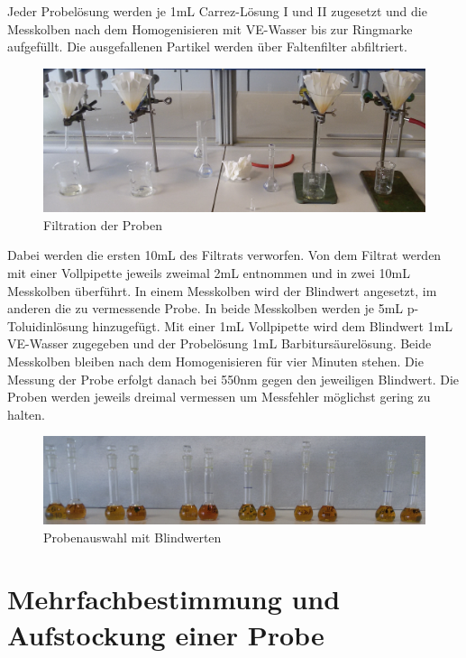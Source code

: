Jeder Probelösung werden je 1mL Carrez-Lösung I und II zugesetzt und die Messkolben nach dem Homogenisieren mit VE-Wasser bis zur Ringmarke aufgefüllt. Die ausgefallenen Partikel werden über Faltenfilter abfiltriert.

\begin{figure}[htbp]
    \centering
        \includegraphics[width=1.00\textwidth]{../Bilder/20150427_131648.jpg}
    \caption{Filtration der Proben}
    \label{fig:Filtration}
\end{figure}

Dabei werden die ersten 10mL des Filtrats verworfen. Von dem Filtrat werden mit einer Vollpipette jeweils zweimal 2mL entnommen und in zwei 10mL Messkolben überführt. In einem Messkolben wird der Blindwert angesetzt, im anderen die zu vermessende Probe. In beide Messkolben werden je 5mL p-Toluidinlösung hinzugefügt. Mit einer 1mL Vollpipette wird dem Blindwert 1mL VE-Wasser zugegeben und der Probelösung 1mL Barbitursäurelösung. Beide Messkolben bleiben nach dem Homogenisieren für vier Minuten stehen. Die Messung der Probe erfolgt danach bei 550nm gegen den jeweiligen Blindwert. Die Proben werden jeweils dreimal vermessen um Messfehler möglichst gering zu halten.
\begin{figure}[htbp]
    \centering
        \includegraphics[width=1.00\textwidth]{../Bilder/20150427_140221(0).jpg}
    \caption{Probenauswahl mit Blindwerten}
    \label{fig:Probenauswahl}
\end{figure}

\newpage
\section{Mehrfachbestimmung und Aufstockung einer Probe}

